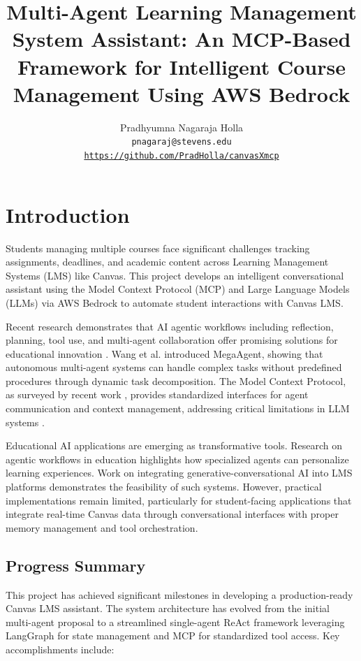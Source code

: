 \documentclass{article}
\title{Multi-Agent Learning Management System Assistant: An MCP-Based Framework for Intelligent Course Management Using AWS Bedrock}
\author{%
   Pradhyumna Nagaraja Holla \\
 \texttt{pnagaraj@stevens.edu} \\
 \texttt{\url{https://github.com/PradHolla/canvasXmcp}}
}
\begin{document}
\maketitle

\section{Introduction}

Students managing multiple courses face significant challenges tracking assignments, deadlines, and academic content across Learning Management Systems (LMS) like Canvas. This project develops an intelligent conversational assistant using the Model Context Protocol (MCP) and Large Language Models (LLMs) via AWS Bedrock to automate student interactions with Canvas LMS.

Recent research demonstrates that AI agentic workflows including reflection, planning, tool use, and multi-agent collaboration offer promising solutions for educational innovation \cite{education2025agentic}. Wang et al. \cite{wang2025megaagent} introduced MegaAgent, showing that autonomous multi-agent systems can handle complex tasks without predefined procedures through dynamic task decomposition. The Model Context Protocol, as surveyed by recent work \cite{mcp2025landscape, mcp2025survey}, provides standardized interfaces for agent communication and context management, addressing critical limitations in LLM systems \cite{mcpenhance2025}.

Educational AI applications are emerging as transformative tools. Research on agentic workflows in education \cite{education2025agentic} highlights how specialized agents can personalize learning experiences. Work on integrating generative-conversational AI into LMS platforms \cite{lms2025ai} demonstrates the feasibility of such systems. However, practical implementations remain limited, particularly for student-facing applications that integrate real-time Canvas data through conversational interfaces with proper memory management and tool orchestration.

\subsection{Progress Summary}

This project has achieved significant milestones in developing a production-ready Canvas LMS assistant. The system architecture has evolved from the initial multi-agent proposal to a streamlined single-agent ReAct framework leveraging LangGraph for state management and MCP for standardized tool access. Key accomplishments include:
\end{document}
